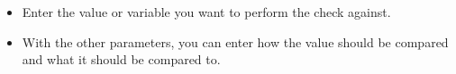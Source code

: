 
\begin{itemize}
\item Enter the value or variable you want to perform the check against. 
\item With the other parameters, you can enter how the value should be compared and what it should be compared to.
\end{itemize}
